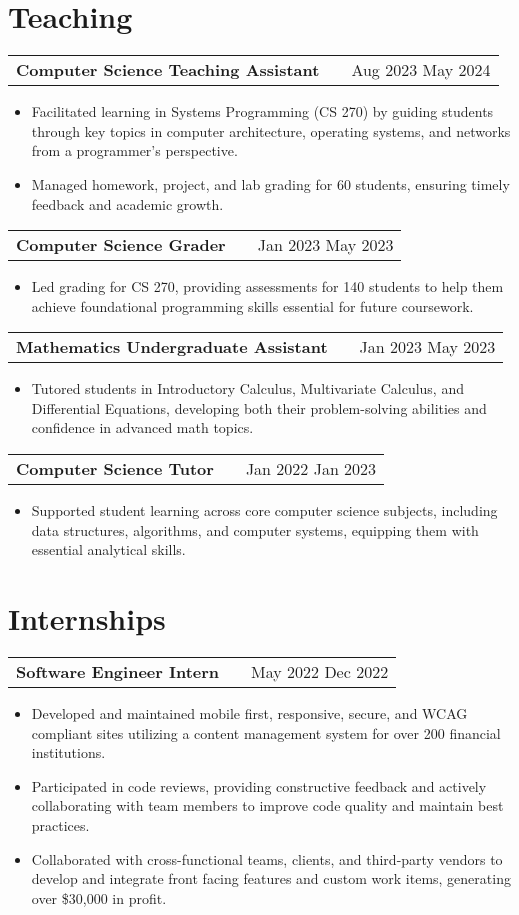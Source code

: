 \documentclass[a4paper,12pt]{article}
\makeatletter
\newenvironment{joblong}[2]
    {
    \begin{tabularx}{\linewidth}{@{}l X r@{}}
    \textbf{#1} & \hfill &  #2 \\[3.75pt]
    \end{tabularx}
    \begin{minipage}[t]{\linewidth}
    \begin{itemize}[nosep,after=\strut, leftmargin=1em, itemsep=3pt,label=--]
    }
    {
    \end{itemize}
    \end{minipage}    
    }
\makeatother
\begin{document}
\section{Teaching}

\begin{joblong}{Computer Science Teaching Assistant}{Aug 2023 May 2024} %
\item Facilitated learning in Systems Programming (CS 270) by guiding students through key topics in computer architecture, operating systems, and networks from a programmer's perspective. %
\item Managed homework, project, and lab grading for 60 students, ensuring timely feedback and academic growth. %
\end{joblong}

\begin{joblong}{Computer Science Grader}{Jan 2023 May 2023} %
\item Led grading for CS 270, providing assessments for 140 students to help them achieve foundational programming skills essential for future coursework. %
\end{joblong}

\begin{joblong}{Mathematics Undergraduate Assistant}{Jan 2023 May 2023} %
\item Tutored students in Introductory Calculus, Multivariate Calculus, and Differential Equations, developing both their problem-solving abilities and confidence in advanced math topics. %
\end{joblong}

\begin{joblong}{Computer Science Tutor}{Jan 2022 Jan 2023} %
\item Supported student learning across core computer science subjects, including data structures, algorithms, and computer systems, equipping them with essential analytical skills. %
\end{joblong}


\section{Internships}

\begin{joblong}{Software Engineer Intern}{May 2022 Dec 2022} %
\item Developed and maintained mobile first, responsive, secure, and WCAG compliant sites utilizing a content management system for over 200 financial institutions. %
\item Participated in code reviews, providing constructive feedback and actively collaborating with team members to improve code quality and maintain best practices. %
\item Collaborated with cross-functional teams, clients, and third-party vendors to develop and integrate front facing features and custom work items, generating over \$30,000 in profit. %
\end{joblong}
\end{document}
